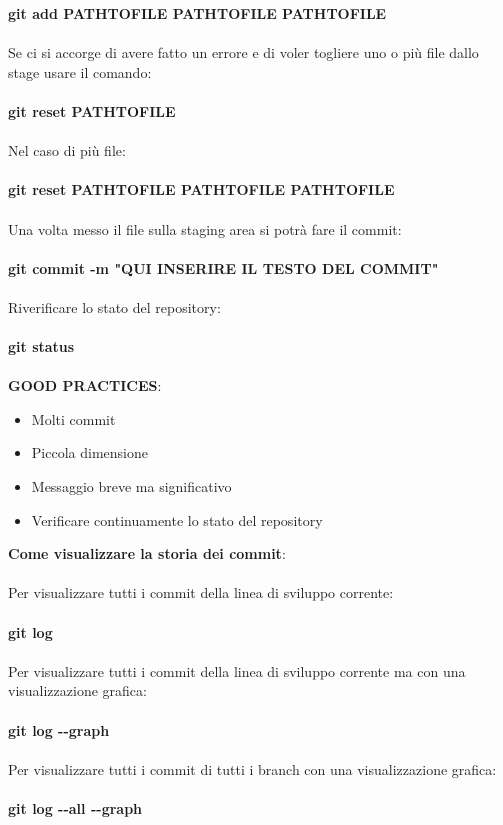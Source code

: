 \documentclass[a4paper,12pt]{report}
\begin{document}
\textbf{git add PATH\textunderscore TO\textunderscore FILE PATH\textunderscore TO\textunderscore FILE PATH\textunderscore TO\textunderscore FILE}
\\\\
Se ci si accorge di avere fatto un errore e di voler togliere uno o più file dallo stage usare il comando:
\\\\
\textbf{git reset PATH\textunderscore TO\textunderscore FILE}
\\\\
Nel caso di più file:
\\\\
\textbf{git reset PATH\textunderscore TO\textunderscore FILE PATH\textunderscore TO\textunderscore FILE PATH\textunderscore TO\textunderscore FILE}
\\\\
Una volta messo il file sulla staging area si potrà fare il commit:
\\\\
\textbf{git commit -m "QUI INSERIRE IL TESTO DEL COMMIT"}
\\\\
Riverificare lo stato del repository:
\\\\
\textbf{git status}
\\\\
\textbf{GOOD PRACTICES}:
\begin{itemize}
\item Molti commit
\item Piccola dimensione
\item Messaggio breve ma significativo
\item Verificare continuamente lo stato del repository
\end{itemize}
\textbf{Come visualizzare la storia dei commit}:
\\\\
Per visualizzare tutti i commit della linea di sviluppo corrente:
\\\\
\textbf{git log}
\\\\
Per visualizzare tutti i commit della linea di sviluppo corrente ma con una visualizzazione grafica:
\\\\
\textbf{git log -{}-graph}
\\\\
Per visualizzare tutti i commit di tutti i branch con una visualizzazione grafica:
\\\\
\textbf{git log -{}-all -{}-graph}
\end{document}
